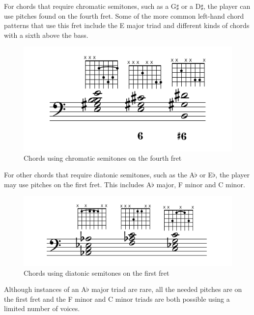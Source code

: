 For chords that require chromatic semitones, such as a G$\sharp$ or a D$\sharp$, the
player can use pitches found on the fourth fret.  Some of the more common left-hand chord
patterns that use this fret include the E major triad and different kinds of chords with a
sixth above the bass.
\begin{figure}[h]
\centering
\includegraphics{examples/g-sharp.pdf}
\caption{Chords using chromatic semitones on the fourth fret}
\label{fourth-fret-chords}
\end{figure}
For other chords that require diatonic semitones, such as the A$\flat$ or E$\flat$, the
player may use pitches on the first fret.  This includes A$\flat$ major, F minor and C
minor.
\begin{figure}[h]
\centering
\includegraphics{examples/a-flat.pdf}
\caption{Chords using diatonic semitones on the first fret}
\label{first-fret-chords}
\end{figure}
Although instances of an A$\flat$ major triad are rare, all the needed pitches are on the
first fret and the F minor and C minor triads are both possible using a limited number of voices.

